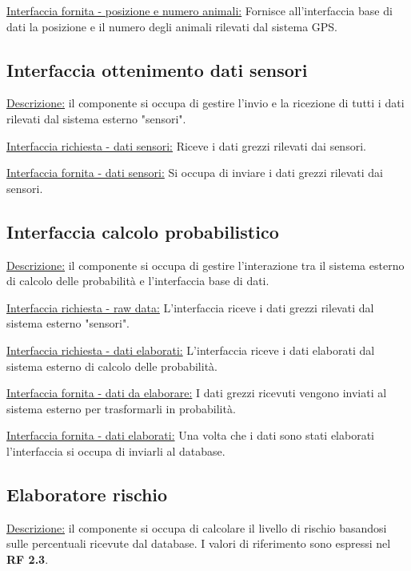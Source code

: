 \vspace{5mm}
\noindent
\underline{Interfaccia fornita - posizione e numero animali:} Fornisce all'interfaccia base di dati la posizione e il numero degli animali rilevati dal sistema GPS.

\subsection*{Interfaccia ottenimento dati sensori}
\underline{Descrizione:} il componente si occupa di gestire l'invio e la ricezione di tutti i dati rilevati dal sistema esterno "sensori".

\vspace{5mm}
\noindent
\underline{Interfaccia richiesta - dati sensori:} Riceve i dati grezzi rilevati dai sensori.

\vspace{5mm}
\noindent
\underline{Interfaccia fornita - dati sensori:} Si occupa di inviare i dati grezzi rilevati dai sensori.

\subsection*{Interfaccia calcolo probabilistico}
\underline{Descrizione:} il componente si occupa di gestire l'interazione tra il sistema esterno di calcolo delle probabilità e l'interfaccia base di dati.

\vspace{5mm}
\noindent
\underline{Interfaccia richiesta - raw data:} L'interfaccia riceve i dati grezzi rilevati dal sistema esterno "sensori".

\vspace{5mm}
\noindent
\underline{Interfaccia richiesta - dati elaborati:} L'interfaccia riceve i dati elaborati dal sistema esterno di calcolo delle probabilità.

\vspace{5mm}
\noindent
\underline{Interfaccia fornita - dati da elaborare:} I dati grezzi ricevuti vengono inviati al sistema esterno per trasformarli in probabilità.

\vspace{5mm}
\noindent
\underline{Interfaccia fornita - dati elaborati:} Una volta che i dati sono stati elaborati l'interfaccia si occupa di inviarli al database.

\subsection*{Elaboratore rischio}
\underline{Descrizione:} il componente si occupa di calcolare il livello di rischio basandosi sulle percentuali ricevute dal database. I valori di riferimento sono espressi nel \textbf{RF 2.3}.

